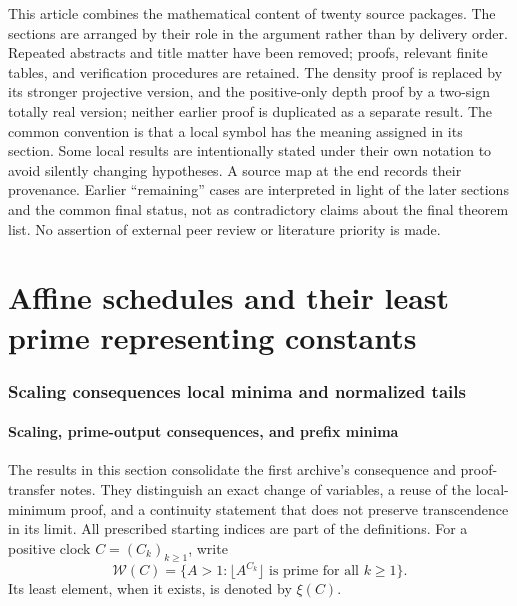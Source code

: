 \documentclass[11pt,a4paper]{article}
\theoremstyle{definition}\newtheorem{definition}[theorem]{Definition}
\theoremstyle{remark}\newtheorem{remark}[theorem]{Remark}
\begin{document}
This article combines the mathematical content of twenty source packages.
The sections are arranged by their role in the argument rather than by
delivery order. Repeated abstracts and title matter have been removed;
proofs, relevant finite tables, and verification procedures are retained. The density proof is replaced by its stronger projective version, and the positive-only depth proof by a two-sign totally real version; neither earlier proof is duplicated as a separate result.
The common convention is that a local symbol has the meaning assigned in its section. Some local results are intentionally stated under their own notation to
avoid silently changing hypotheses. A source map at the end records their
provenance. Earlier ``remaining'' cases are interpreted in light of the
later sections and the common final status, not as contradictory claims
about the final theorem list. No assertion of external peer review or
literature priority is made.

\clearpage\part{Affine schedules and their least prime representing constants}

\section{Scaling consequences local minima and normalized tails}\label{src:INIT}

\subsection{Scaling, prime-output consequences, and prefix minima}
\label{sec:init-consequences}

The results in this section consolidate the first archive's consequence
and proof-transfer notes. They distinguish an exact change of variables,
a reuse of the local-minimum proof, and a continuity statement that does
not preserve transcendence in its limit. All prescribed starting indices
are part of the definitions.
For a positive clock $C=(C_k)_{k\ge1}$, write
\[
 \mathcal W(C)=\{A>1:\lfloor A^{C_k}\rfloor\text{ is prime for all }k\ge1\}.
\]
Its least element, when it exists, is denoted by $\xi(C)$.
\end{document}
